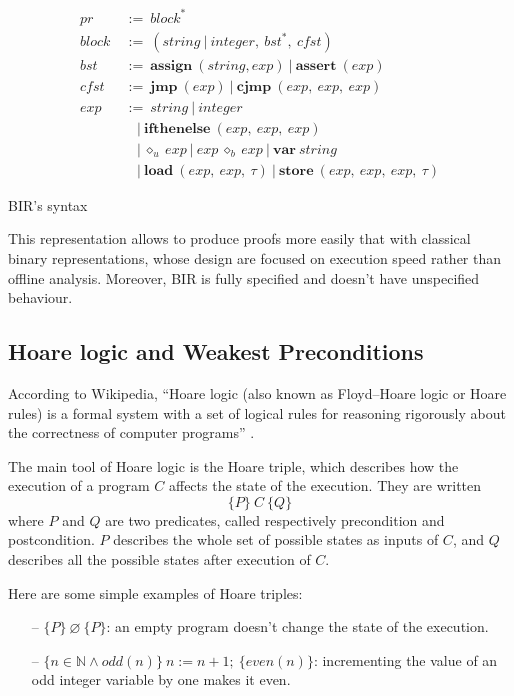 \documentclass{kththesis}
\begin{document}
\begin{table}
	\begin{align*}
		pr~    & :=~block^{\ast}                                                             \\
		block~ & :=~(string~|~integer,~bst^{\ast},~cfst)                                     \\
		bst~   & :=~\textbf{assign}~(string, exp)~|~\textbf{assert}~(exp)                    \\
		cfst~  & :=~\textbf{jmp}~(exp)~|~\textbf{cjmp}~(exp,~exp,~exp)                       \\
		exp~   & :=~string~|~integer                                                         \\
		       & ~~~~|~\textbf{ifthenelse}~(exp,~exp,~exp)                                   \\
		       & ~~~~|~\diamond_{u}~exp~|~exp~\diamond_{b}~exp~|~\textbf{var}~string         \\
		       & ~~~~|~\textbf{load}~(exp,~exp,~\tau)~|~\textbf{store}~(exp,~exp,~exp,~\tau) 
	\end{align*}
	\caption{BIR's syntax}
	\label{bir-syntax}
\end{table}

This representation allows to produce proofs more easily that with classical
binary representations, whose design are focused on execution speed rather than
offline analysis. Moreover, BIR is fully specified and doesn't have unspecified
behaviour.

\subsection{Hoare logic and Weakest Preconditions}

According to Wikipedia, ``Hoare logic (also known as Floyd–Hoare logic or Hoare
rules) is a formal system with a set of logical rules for reasoning rigorously
about the correctness of computer programs'' \cite{noauthor_hoare_2019}.

The main tool of Hoare logic is the Hoare triple, which describes how the
execution of a program $C$ affects the state of the execution. They are written
$$\{P\}~C~\{Q\}$$ where $P$ and $Q$ are two predicates, called respectively
precondition and postcondition. $P$ describes the whole set of possible states
as inputs of $C$, and $Q$ describes all the possible states after execution of
$C$.

Here are some simple examples of Hoare triples:
\begin{itemize}
	\item[--] $\{P\}~\varnothing~\{P\}$: an empty program doesn't change the
	      state of the execution.
	\item[--] $\{n\in \mathbb{N} \land odd(n)\}~n:=n+1;~\{even(n)\}$:
	      incrementing the value of an odd integer variable by one makes it even.
\end{itemize}
\end{document}
